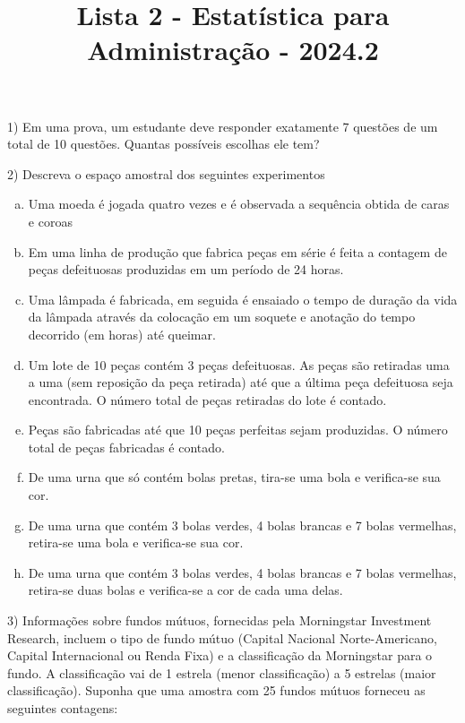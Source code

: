\documentclass{article}
\title{Lista 2 - Estatística para Administração - 2024.2}
\begin{document}
\date{}
\maketitle

\vspace{5px}

1) Em uma prova, um estudante deve responder exatamente 7 questões de um total de 10 questões. Quantas possíveis escolhas ele tem?

\vspace{5px}


2) Descreva o espaço amostral dos seguintes experimentos

\begin{enumerate}[a)] %
    \item Uma moeda é jogada quatro vezes e é observada a sequência obtida de caras e coroas
    \item Em uma linha de produção que fabrica peças em série é feita a contagem de peças defeituosas produzidas em um período de 24 horas. 
    \item Uma lâmpada é fabricada, em seguida é ensaiado o tempo de duração da vida da lâmpada através da colocação em um soquete e anotação do tempo decorrido (em horas) até queimar.
    \item Um lote de 10 peças contém 3 peças defeituosas. As peças são retiradas uma a uma (sem reposição da peça retirada) até que a última peça defeituosa seja encontrada. O número total de peças retiradas do lote é contado. 
    \item Peças são fabricadas até que 10 peças perfeitas sejam produzidas. O número total de peças fabricadas é contado. 
    \item De uma urna que só contém bolas pretas, tira-se uma bola e verifica-se sua cor. 
    \item De uma urna que contém 3 bolas verdes, 4 bolas brancas e 7 bolas vermelhas, retira-se uma bola e verifica-se sua cor. 
    \item De uma urna que contém 3 bolas verdes, 4 bolas brancas e 7 bolas vermelhas, retira-se duas bolas e verifica-se a cor de cada uma delas. 
\end{enumerate}

\vspace{5px}



3) Informações sobre fundos mútuos, fornecidas pela Morningstar Investment Research, incluem o tipo de fundo mútuo (Capital Nacional Norte-Americano, Capital Internacional ou Renda Fixa) e a classificação da Morningstar para o fundo. A classificação vai de 1 estrela (menor classificação) a 5 estrelas (maior classificação). Suponha que uma amostra com 25 fundos mútuos forneceu as seguintes contagens:
\end{document}
